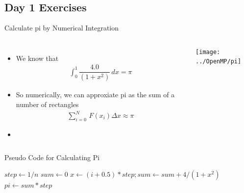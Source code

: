 \documentclass[c,mathserif,compress,xcolor=svgnames]{beamer}
\begin{document}
\subsection{Day 1 Exercises}
\begin{frame}[allowframebreaks]{Calculate pi by Numerical Integration}
  \begin{columns}
    \column{5cm}
    \begin{itemize}
      \item We know that
      \begin{align*}
        \int^1_0 \dfrac{4.0}{(1+x^2)}\, dx = \pi
      \end{align*}
      \item So numerically, we can approxiate pi as the sum of a number of rectangles
      \begin{align*}
        \sum^N_{i=0}\,F(x_i)\Delta x \approx \pi
      \end{align*}
      \item[] 
    \end{itemize}
    \column{5cm}
    \begin{center}
      \texttt{[image: ../OpenMP/pi]}
    \end{center}
  \end{columns}

  \begin{algorithm}[H]
    \caption{Pseudo Code for Calculating Pi}
    \begin{algorithmic}
        \State $step \gets 1/n$
        \State $sum \gets 0$
        \State $x \gets (i+0.5)*step; sum \gets sum + 4/(1+x^2)$
        \EndDo
        \State $pi \gets sum * step$
        \EndFunction
    \end{algorithmic}
  \end{algorithm}
\end{frame}
\end{document}
